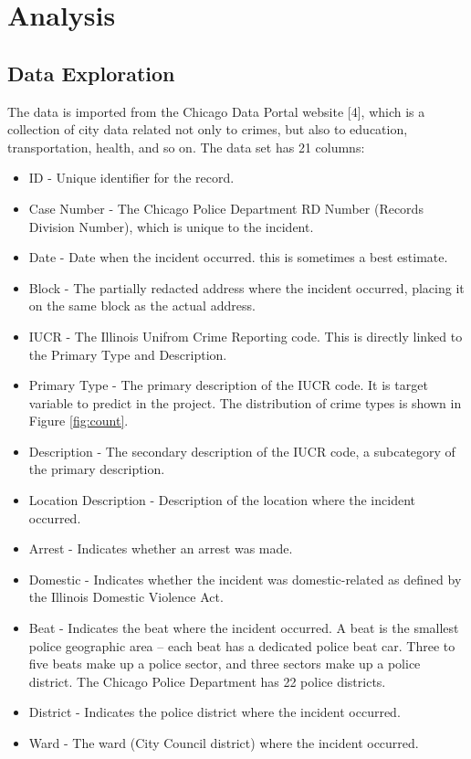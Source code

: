 \documentclass[12pt]{article}
\begin{document}
\section{Analysis}
\subsection{Data Exploration}
The data is imported from the Chicago Data Portal website [4], which is a collection of city data related not only to crimes, but also to education, transportation, health, and so on.
The data set has 21 columns:
\begin{itemize}
\item ID - Unique identifier for the record.
\item Case Number - The Chicago Police Department RD Number (Records Division Number), which is unique to the incident.
\item Date - Date when the incident occurred. this is sometimes a best estimate.
\item Block - The partially redacted address where the incident occurred, placing it on the same block as the actual address.
\item IUCR - The Illinois Unifrom Crime Reporting code. This is directly linked to the Primary Type and Description.
\item Primary Type - The primary description of the IUCR code. It is target variable to predict in the project. The distribution of crime types is shown in Figure \ref{fig:count}.
\item Description - The secondary description of the IUCR code, a subcategory of the primary description.
\item Location Description - Description of the location where the incident occurred.
\item Arrest - Indicates whether an arrest was made.
\item Domestic - Indicates whether the incident was domestic-related as defined by the Illinois Domestic Violence Act.
\item Beat - Indicates the beat where the incident occurred. A beat is the smallest police geographic area – each beat has a dedicated police beat car. Three to five beats make up a police sector, and three sectors make up a police district. The Chicago Police Department has 22 police districts.
\item District - Indicates the police district where the incident occurred.
\item Ward - The ward (City Council district) where the incident occurred.

\end{itemize}
\end{document}
